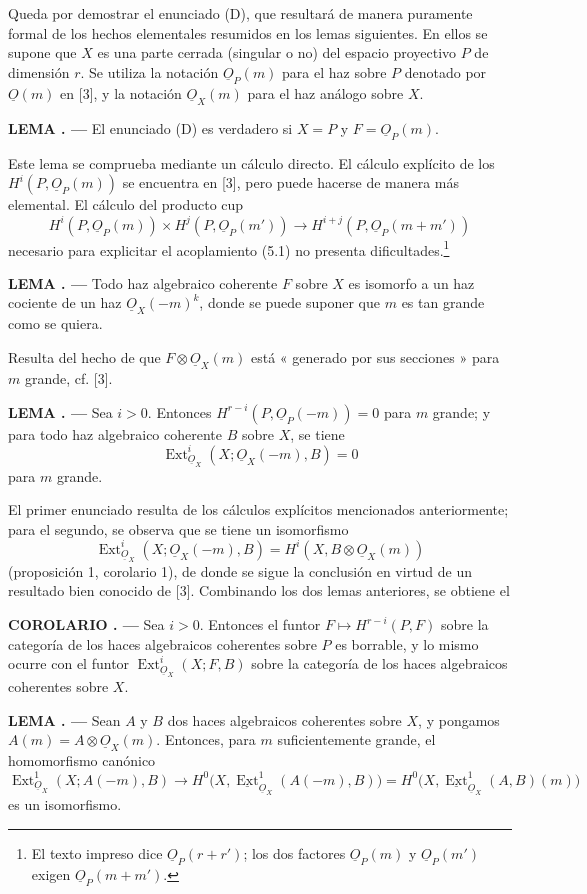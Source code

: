 \documentclass[11pt,twoside,openany]{book}
\numberwithin{equation}{section}
\newcommand{\src}[1]{%
  \phantomsection\hypertarget{src:#1}{}%
  \marginpar{\raggedleft\footnotesize\sffamily #1}%
}
\newcommand{\Osh}{\underline{O}}
\newcommand{\Extsh}{\underline{\operatorname{Ext}}}
\theoremstyle{plain}
\theoremstyle{definition}
\theoremstyle{remark}
\newcommand{\result}[2]{%
  \par\medskip\noindent\textbf{#1%
  \if\relax\detokenize{#2}\relax\else\space#2\fi. ---}\enspace
}
\newcommand{\FgaUnitKey}{frontmatter}
\renewcommand{\src}[1]{%
  \phantomsection\hypertarget{src:\FgaUnitKey:#1}{}%
  \marginpar{\raggedleft\footnotesize\sffamily #1}%
}
\theoremstyle{plain}
\theoremstyle{definition}
\theoremstyle{remark}
\begin{document}
Queda por demostrar el enunciado (D), que resultará de manera puramente formal de los hechos
elementales resumidos en los lemas siguientes. En ellos se supone que $X$ es una
parte cerrada (singular o no) del espacio proyectivo $P$ de dimensión $r$.
Se utiliza la notación $\Osh_P(m)$ para el haz sobre $P$ denotado por $\Osh(m)$ en
[3], y la notación $\Osh_X(m)$ para el haz análogo sobre $X$.

\result{LEMA}{2} El enunciado (D) es verdadero si $X=P$ y $F=\Osh_P(m)$.

Este lema se comprueba mediante un cálculo directo. El cálculo explícito de los
$H^{i}(P,\Osh_P(m))$ se encuentra en [3], pero puede hacerse de manera más
elemental. El cálculo del producto cup
\[
  H^{i}(P,\Osh_P(m))\times H^{j}(P,\Osh_P(m'))
  \longrightarrow H^{i+j}(P,\Osh_P(m+m'))
\]
necesario para explicitar el acoplamiento (5.1) no presenta
dificultades.\footnote{El texto impreso dice $\Osh_P(r+r')$; los dos factores
$\Osh_P(m)$ y $\Osh_P(m')$ exigen $\Osh_P(m+m')$.}

\result{LEMA}{3} Todo haz algebraico coherente $F$ sobre $X$ es isomorfo a
un haz cociente de un haz $\Osh_X(-m)^{k}$, donde se puede suponer que $m$ es
tan grande como se quiera.

Resulta del hecho de que $F\otimes\Osh_X(m)$ está « generado por sus secciones » para
$m$ grande, cf. [3].

\result{LEMA}{4} Sea $i>0$. Entonces
$H^{r-i}(P,\Osh_P(-m))=0$ para $m$ grande; y para todo haz algebraico
coherente $B$ sobre $X$, se tiene
\[
  \operatorname{Ext}_{\Osh_X}^{i}(X;\Osh_X(-m),B)=0
\]
para $m$ grande.

El primer enunciado resulta de los cálculos explícitos mencionados anteriormente; para el
segundo, se observa que se tiene un isomorfismo
\[
  \operatorname{Ext}_{\Osh_X}^{i}(X;\Osh_X(-m),B)
  =H^{i}(X,B\otimes\Osh_X(m))
\]
(proposición 1, corolario 1), de donde se sigue la conclusión en virtud de un resultado bien
conocido de [3]. Combinando los dos lemas anteriores, se obtiene el

\result{COROLARIO}{} Sea $i>0$. Entonces el funtor
$F\longmapsto H^{r-i}(P,F)$ sobre la categoría de los haces algebraicos coherentes
sobre $P$ es borrable, y lo mismo ocurre con el funtor
$\operatorname{Ext}_{\Osh_X}^{i}(X;F,B)$ sobre la categoría de los haces
algebraicos coherentes sobre $X$.

\src{184}
\result{LEMA}{5} Sean $A$ y $B$ dos haces algebraicos coherentes sobre
$X$, y pongamos $A(m)=A\otimes\Osh_X(m)$. Entonces, para $m$ suficientemente grande,
el homomorfismo canónico
\[
  \operatorname{Ext}_{\Osh_X}^{1}(X;A(-m),B)
  \longrightarrow H^{0}\bigl(X,\Extsh_{\Osh_X}^{1}(A(-m),B)\bigr)
  =H^{0}\bigl(X,\Extsh_{\Osh_X}^{1}(A,B)(m)\bigr)
\]
es un isomorfismo.
\end{document}
